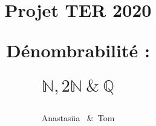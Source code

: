 \newcommand{\deffunct}[5]{%
\begin{align*}%
      #1 \colon & #2 \to #3\\
       &#4\xmapsto{\hphantom{#1}} #5
\end{align*}%
}
\newcommand{\HRule}{\rule{\paperwidth}{0.5mm}} %
\newcommand*{\theuniversity}{Université de Toulon}
\newcommand*{\theyearname}{Licence de Mathématiques, parcours mathématiques, 
2\ieme~année}
\newcommand*{\thesupervisor}{Joachim \bsc{Asch}}
\author{Anastasiia ~\&~Tom }
\title{Projet TER 2020\par
            Dénombrabilité : \par $\mathbb{N},2\mathbb{N} \ \& \ \mathbb{Q}$\par}

\DeclareMathOperator{\Card}{Card} %


\setlrmargins{*}{*}{*}         %
\checkandfixthelayout[nearest]
